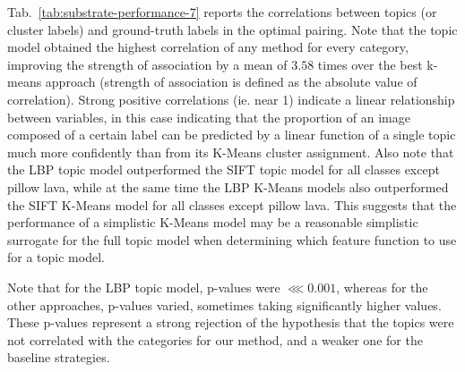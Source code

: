 Tab.~\ref{tab:substrate-performance-7} reports the correlations between topics (or cluster labels) and ground-truth labels in the optimal pairing. Note that the topic model obtained the highest correlation of any method for every category, improving the strength of association by a mean of $3.58$ times over the best k-means approach (strength of association is defined as the absolute value of correlation). Strong positive correlations (ie. near 1) indicate a linear relationship between variables, in this case indicating that the proportion of an image composed of a certain label can be predicted by a linear function of a single topic much more confidently than from its K-Means cluster assignment. Also note that the LBP topic model outperformed the SIFT topic model for all classes except pillow lava, while at the same time the LBP K-Means models also outperformed the SIFT K-Means model for all classes except pillow lava. This suggests that the performance of a simplistic K-Means model may be a reasonable simplistic surrogate for the full topic model when determining which feature function to use for a topic model.

Note that for the LBP topic model, p-values were $ \lll 0.001 $, whereas for the other approaches, p-values varied, sometimes taking significantly higher values.
These p-values represent a strong rejection of the hypothesis that the topics were not correlated with the categories for our method, and a weaker one for the baseline strategies.

